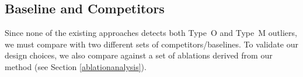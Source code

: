
\subsection{Baseline and Competitors}

Since none of the existing approaches detects both Type~O and Type~M outliers, we must compare with two different sets of competitors/baselines. To validate our design choices, we also compare against a set of ablations derived from our method (see Section \ref{ablationanalysis}). 

